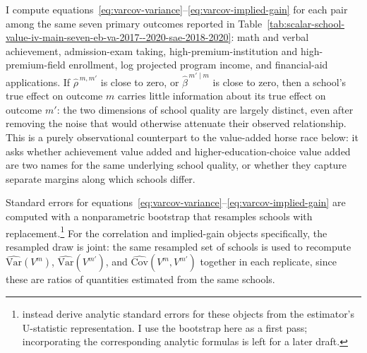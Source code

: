 \documentclass[a4paper, article, english, oneside, unknownkeysallowed, 12pt]{memoir}
\begin{document}
I compute equations~\eqref{eq:varcov-variance}--\eqref{eq:varcov-implied-gain} for each pair among the same seven primary outcomes reported in Table~\ref{tab:scalar-school-value-iv-main-seven-eb-va-2017--2020-sae-2018-2020}: math and verbal achievement, admission-exam taking, high-premium-institution and high-premium-field enrollment, log projected program income, and financial-aid applications.
If $\widehat\rho^{\,m,m'}$ is close to zero, or $\widehat\beta^{\,m'\mid m}$ is close to zero, then a school's true effect on outcome $m$ carries little information about its true effect on outcome $m'$: the two dimensions of school quality are largely distinct, even after removing the noise that would otherwise attenuate their observed relationship.
This is a purely observational counterpart to the value-added horse race below: it asks whether achievement value added and higher-education-choice value added are two names for the same underlying school quality, or whether they capture separate margins along which schools differ.

Standard errors for equations~\eqref{eq:varcov-variance}--\eqref{eq:varcov-implied-gain} are computed with a nonparametric bootstrap that resamples schools with replacement.\footnote{\textcite{rose_effects_2022} instead derive analytic standard errors for these objects from the estimator's U-statistic representation. I use the bootstrap here as a first pass; incorporating the corresponding analytic formulas is left for a later draft.}
For the correlation and implied-gain objects specifically, the resampled draw is joint: the same resampled set of schools is used to recompute $\widehat{\mathrm{Var}}(V^m)$, $\widehat{\mathrm{Var}}(V^{m'})$, and $\widehat{\mathrm{Cov}}(V^m,V^{m'})$ together in each replicate, since these are ratios of quantities estimated from the same schools.

\clearpage




\end{document}

